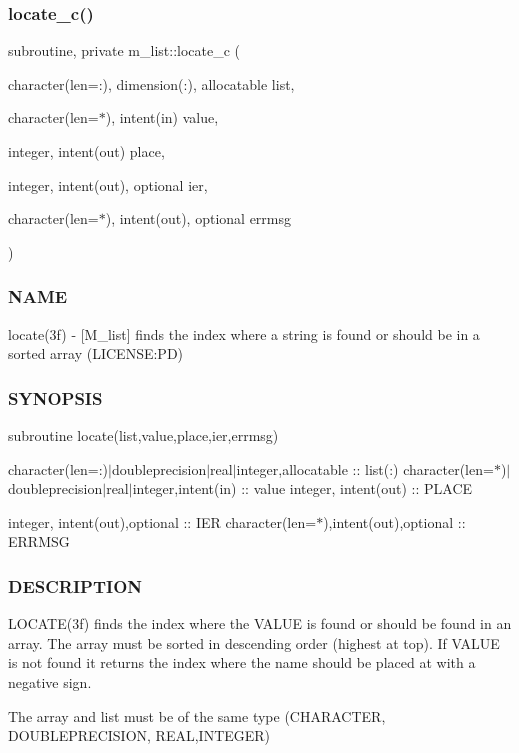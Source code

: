 \subsubsection{\texorpdfstring{locate\+\_\+c()}{locate\_c()}}
{\footnotesize\ttfamily subroutine, private m\+\_\+list\+::locate\+\_\+c (\begin{DoxyParamCaption}\item[{character(len=\+:), dimension(\+:), allocatable}]{list,  }\item[{character(len=$\ast$), intent(in)}]{value,  }\item[{integer, intent(out)}]{place,  }\item[{integer, intent(out), optional}]{ier,  }\item[{character(len=$\ast$), intent(out), optional}]{errmsg }\end{DoxyParamCaption})\hspace{0.3cm}{\ttfamily [private]}}



\subsubsection*{N\+A\+ME}

locate(3f) -\/ \mbox{[}M\+\_\+list\mbox{]} finds the index where a string is found or should be in a sorted array (L\+I\+C\+E\+N\+SE\+:PD) 

\subsubsection*{S\+Y\+N\+O\+P\+S\+IS}

subroutine locate(list,value,place,ier,errmsg)

character(len=\+:)$\vert$doubleprecision$\vert$real$\vert$integer,allocatable \+:\+: list(\+:) character(len=$\ast$)$\vert$doubleprecision$\vert$real$\vert$integer,intent(in) \+:\+: value integer, intent(out) \+:\+: P\+L\+A\+CE

integer, intent(out),optional \+:\+: I\+ER character(len=$\ast$),intent(out),optional \+:\+: E\+R\+R\+M\+SG

\subsubsection*{D\+E\+S\+C\+R\+I\+P\+T\+I\+ON}

\begin{DoxyVerb}LOCATE(3f) finds the index where the VALUE is found or should
be found in an array. The array must be sorted in descending
order (highest at top). If VALUE is not found it returns the index
where the name should be placed at with a negative sign.

The array and list must be of the same type (CHARACTER, DOUBLEPRECISION,
REAL,INTEGER)
\end{DoxyVerb}


